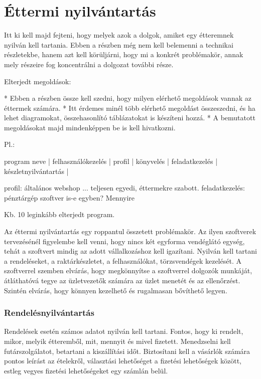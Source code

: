 \chapter{Éttermi nyilvántartás}

Itt ki kell majd fejteni, hogy melyek azok a dolgok, amiket egy étteremnek nyilván kell tartania. Ebben a részben még nem kell belemenni a technikai részletekbe, hanem azt kell körüljárni, hogy mi a konkrét problémakör, annak mely részeire fog koncentrálni a dolgozat további része.

Elterjedt megoldások:

* Ebben a részben össze kell szedni, hogy milyen elérhető megoldások vannak az éttermek számára.
* Itt érdemes minél több elérhető megoldást összeszedni, és ha lehet diagramokat, összehasonlító táblázatokat is készíteni hozzá.
* A bemutatott megoldásokat majd mindenképpen be is kell hivatkozni.


Pl.:

program neve | felhasználókezelés | profil | könyvelés | feladatkezelés | készletnyilvántartás |

profil: általános webshop ... teljesen egyedi, éttermekre szabott.
feladatkezelés: pénztárgép szoftver is-e egyben? Mennyire

Kb. 10 leginkább elterjedt program.


Az éttermi nyilvántartás egy roppantul összetett problémakör. Az ilyen szoftverek tervezésénél figyelembe kell venni, hogy nincs két egyforma vendéglátó egység, tehát a szoftvert mindig az adott vállalkozáshoz kell igazítani. Nyilván kell tartani a rendeléseket, a raktárkészletet, a felhasználókat, törzsvendégek kezelését. A szoftverrel szemben elvárás, hogy megkönnyítse a szoftverrel dolgozók munkáját, átláthatóvá tegye az üzletvezetők számára az üzlet menetét és az ellenőrzést. Szintén elvárás, hogy könnyen kezelhető és rugalmasan bővíthető legyen.

\subsection{Rendelésnyilvántartás}

Rendelések esetén számos adatot nyilván kell tartani. Fontos, hogy ki rendelt, mikor, melyik étteremből, mit, mennyit és mivel fizetett. Menedzselni kell futárszolgálatot, betartani a kiszállítási időt. Biztosítani kell a vásárlók számára pontos leírást az ételekről, választási lehetőséget a fizetési lehetőségek között, estleg vegyes fizetési lehetőségeket egy számlán belül.

